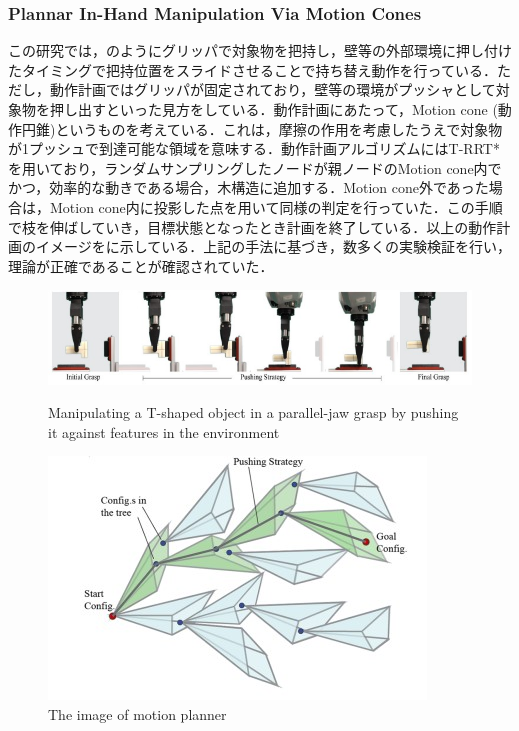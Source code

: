 \documentclass[a4paper,twoside,12pt,papersize, dvipdfmx]{iirthesis}
\begin{document}
\subsubsection{Plannar In-Hand Manipulation Via Motion Cones \cite{chavan-dafle2020}}
この研究では，のようにグリッパで対象物を把持し，壁等の外部環境に押し付けたタイミングで把持位置をスライドさせることで持ち替え動作を行っている．ただし，動作計画ではグリッパが固定されており，壁等の環境がプッシャとして対象物を押し出すといった見方をしている．動作計画にあたって，Motion cone (動作円錐)というものを考えている．これは，摩擦の作用を考慮したうえで対象物が1プッシュで到達可能な領域を意味する．動作計画アルゴリズムにはT-RRT*を用いており，ランダムサンプリングしたノードが親ノードのMotion cone内でかつ，効率的な動きである場合，木構造に追加する．Motion cone外であった場合は，Motion cone内に投影した点を用いて同様の判定を行っていた．この手順で枝を伸ばしていき，目標状態となったとき計画を終了している．以上の動作計画のイメージをに示している．上記の手法に基づき，数多くの実験検証を行い，理論が正確であることが確認されていた．
\begin{figure}
\begin{minipage}{0.49\hsize}
\centering
\includegraphics[width=0.9\hsize]{fig/Introduction/chavan-dafle/manipulation.jpg}
\caption{Manipulating a T-shaped object in a parallel-jaw grasp by pushing it against features in the environment \cite{chavan-dafle2020}}
\label{fig::maniT}
\end{minipage} \hfill
\begin{minipage}{0.49\hsize}
\centering
\includegraphics[width=0.8\hsize]{fig/Introduction/chavan-dafle/rrtimage.jpg}
\caption{The image of motion planner \cite{chavan-dafle2020}}
\label{fig::rrtimage}
\end{minipage}
\end{figure}
\end{document}
